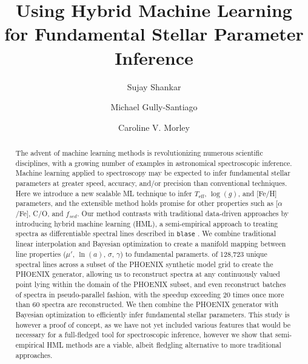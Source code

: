 \documentclass[twocolumn]{aastex631}
\begin{document}
\title{Using Hybrid Machine Learning for Fundamental Stellar Parameter Inference}
\author[0000-0002-2290-6810]{Sujay Shankar}
\author[0000-0002-4020-3457]{Michael Gully-Santiago}
\author[0000-0002-4404-0456]{Caroline V. Morley}


\begin{abstract}
    The advent of machine learning methods is revolutionizing 
    numerous scientific disciplines, with a growing number of examples in astronomical spectroscopic inference. Machine learning applied to spectroscopy may be expected to infer fundamental stellar parameters at greater speed, accuracy, and/or precision than conventional techniques. Here we introduce a new scalable ML technique to infer $T_{\mathrm{eff}}$,
    $\log(g)$, and [Fe/H] parameters, and the extensible method holds promise for other properties such as [$\alpha$/Fe], C/O, and
    $f_{sed}$. Our method contrasts with traditional data-driven
    approaches by introducing hybrid machine 
    learning (HML), a semi-empirical approach 
    to treating spectra as differentiable spectral lines described in 
    \texttt{blase} \citep{blase}.  
    We combine traditional linear interpolation 
    and Bayesian optimization to create a manifold mapping between 
    line properties ($\mu'$, $\ln(a)$, $\sigma$, $\gamma$) to fundamental paramerts.  of 
    128,723 unique spectral lines across a subset of the PHOENIX
    synthetic model grid \citep{PHOENIX} to create the PHOENIX generator, allowing
    us to reconstruct spectra at any continuously valued point 
    lying within the domain of the PHOENIX subset, and even reconstruct 
    batches of spectra in pseudo-parallel fashion, with the speedup 
    exceeding 20 times once more than 60 spectra are reconstructed. 
    We then combine the PHOENIX generator with Bayesian optimization to 
    efficiently infer fundamental stellar parameters. This study is 
    however a proof of concept, as we have not yet included various
    features that would be necessary for a full-fledged tool for 
    spectroscopic inference, however we show that semi-empirical 
    HML methods are a viable, albeit fledgling alternative to 
    more traditional approaches.
\end{abstract}
\end{document}

